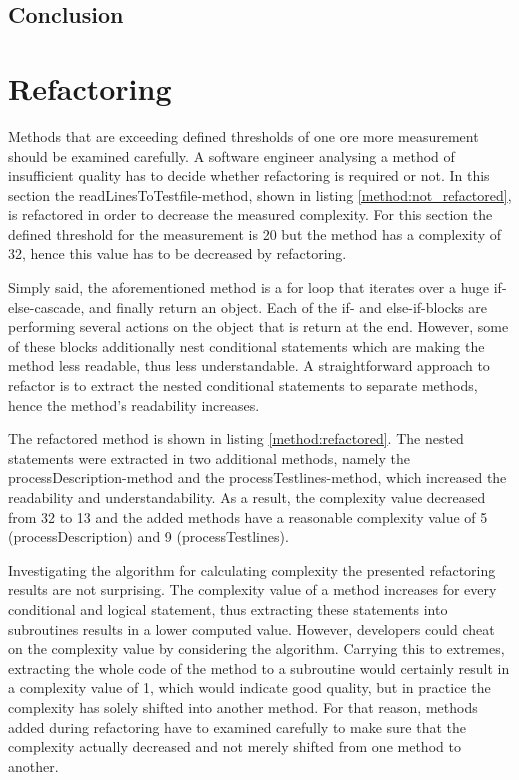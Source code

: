\documentclass[conference]{IEEEtran}
\newcommand{\lref}[1]{listing \ref{#1}}%
\begin{document}
\subsection{Conclusion}

\section{Refactoring}
Methods that are exceeding defined thresholds of one ore more measurement should be examined carefully. A software engineer analysing a method of insufficient quality has to decide whether refactoring is required or not. In this section the readLinesToTestfile-method, shown in \lref{method:not_refactored}, is refactored in order to decrease the measured complexity. For this section the defined threshold for the measurement is 20 but the method has a complexity of 32, hence this value has to be decreased by refactoring.

Simply said, the aforementioned method is a for loop that iterates over a huge if-else-cascade, and finally return an object. Each of the if- and else-if-blocks are performing several actions on the object that is return at the end. However, some of these blocks additionally nest conditional statements which are making the method less readable, thus less understandable. A straightforward approach to refactor is to extract the nested conditional statements to separate methods, hence the method's readability increases. 

The refactored method is shown in \lref{method:refactored}. The nested statements were extracted in two additional methods, namely the processDescription-method and the processTestlines-method, which increased the readability and understandability. As a result, the complexity value decreased from 32 to 13 and the added methods have a reasonable complexity value of 5 (processDescription) and 9 (processTestlines). 

Investigating the algorithm for calculating complexity the presented refactoring results are not surprising. The complexity value of a method increases for every conditional and logical statement, thus extracting these statements into subroutines results in a lower computed value. However, developers could cheat on the complexity value by considering the algorithm. Carrying this to extremes, extracting the whole code of the method to a subroutine would certainly result in a complexity value of 1, which would indicate good quality, but in practice the complexity has solely shifted into another method. For that reason, methods added during refactoring have to examined carefully to make sure that the complexity actually decreased and not merely shifted from one method to another.
\end{document}
